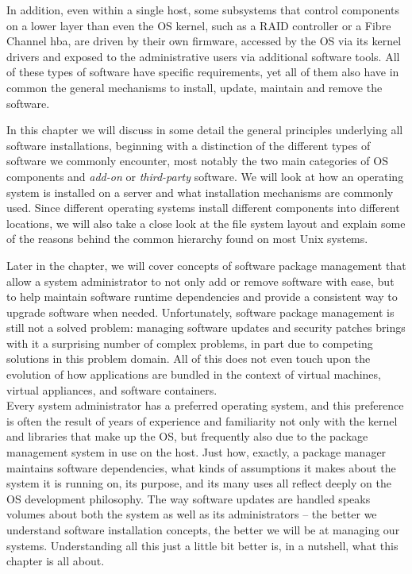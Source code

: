 In addition, even within a single host, some subsystems
that control components on a lower layer than even the
OS kernel, such as a RAID controller or a Fibre
Channel \gls{hba}, are driven by their own
firmware, accessed by the OS via its
kernel drivers and exposed to the administrative users
via additional software tools.  All of these types of
software have specific requirements, yet all of them
also have in common the general mechanisms to install,
update, maintain and remove the software.

In this chapter we will discuss in some detail the
general principles underlying all software
installations, beginning with a distinction of the
different types of software we commonly encounter,
most notably the two main categories of OS components
and {\em add-on} or {\em third-party} software.  We
will look at how an operating system is installed on a
server and what installation mechanisms are commonly
used.  Since different operating systems install
different components into different locations, we will
also take a close look at the file system layout and
explain some of the reasons behind the common
hierarchy found on most Unix systems.

Later in the chapter, we will cover concepts of
software package management that allow a system
administrator to not only add or remove software with
ease, but to help maintain software runtime
dependencies and provide a consistent way to upgrade
software when needed.  Unfortunately, software package
management is still not a solved problem: managing
software updates and security patches brings with it a
surprising number of complex problems, in part due to
competing solutions in this problem domain.  All of
this does not even touch upon the evolution of how
applications are bundled in the context of virtual
machines, virtual appliances, and software
containers. \\

Every system administrator has a preferred operating
system, and this preference is often the result of
years of experience and familiarity not only with the
kernel and libraries that make up the OS, but
frequently also due to the package management system
in use on the host.  Just how, exactly, a package
manager maintains software dependencies, what kinds of
assumptions it makes about the system it is running
on, its purpose, and its many uses all reflect deeply
on the OS development philosophy.  The way software
updates are handled speaks volumes about both the
system as well as its administrators -- the better we
understand software installation concepts, the better
we will be at managing our systems.  Understanding all
this just a little bit better is, in a nutshell, what
this chapter is all about.

